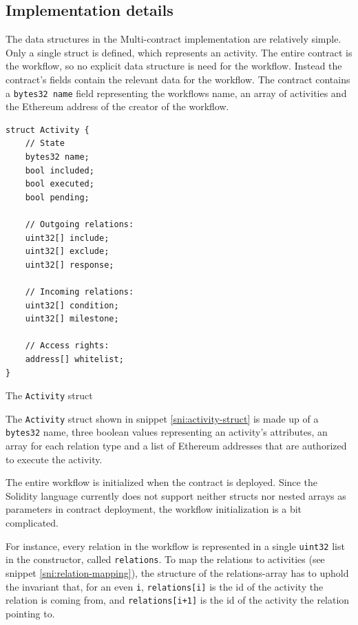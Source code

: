 \documentclass{article}
\begin{document}
		\subsection{Implementation details}
		The data structures in the Multi-contract implementation are relatively simple.
		Only a single struct is defined, which represents an activity.
		The entire contract is the workflow, so no explicit data structure is need for the workflow. 
		Instead the contract's fields contain the relevant data for the workflow.
		The contract contains a \texttt{bytes32 name} field representing the workflows name, an array of activities and the Ethereum address of the creator of the workflow.
		\begin{snippet}[!ht]
			\centering
			\begin{lstlisting}[language=solidity, numbers=none]
struct Activity {
    // State
    bytes32 name;
    bool included;
    bool executed;
    bool pending;

    // Outgoing relations:
    uint32[] include;
    uint32[] exclude;
    uint32[] response;
    
    // Incoming relations:
    uint32[] condition;
    uint32[] milestone;

    // Access rights:
    address[] whitelist;
}				
			\end{lstlisting}
		 	\caption[The \texttt{Activity} struct]
		 	{The \texttt{Activity} struct}
		 	\label{sni:activity-struct}
		\end{snippet}
		The \texttt{Activity} struct shown in snippet \ref{sni:activity-struct} is made up of a \texttt{bytes32} name, three boolean values representing an activity's attributes, an array for each relation type and a list of Ethereum addresses that are authorized to execute the activity.

		The entire workflow is initialized when the contract is deployed.
		Since the Solidity language currently does not support neither structs nor nested arrays as parameters in contract deployment, the workflow initialization is a bit complicated. 

		For instance, every relation in the workflow is represented in a single \texttt{uint32} list in the constructor, called \texttt{relations}. 
		To map the relations to activities (see snippet \ref{sni:relation-mapping}), the structure of the relations-array has to uphold the invariant that, for an even \texttt{i}, \texttt{relations[i]} is the id of the activity the relation is coming from, and \texttt{relations[i+1]} is the id of the activity the relation pointing to.
\end{document}

